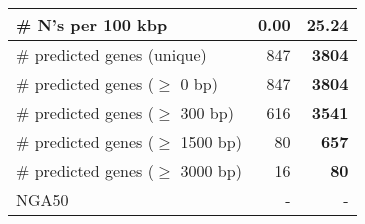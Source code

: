 \documentclass[12pt,a4paper]{article}
\begin{document}
\begin{table}[ht]
\begin{center}
\begin{tabular}{|l*{2}{|r}|}
\# N's per 100 kbp & {\bf 0.00} & 25.24 \\ \hline
\# predicted genes (unique) & 847 & {\bf 3804} \\ \hline
\# predicted genes ($\geq$ 0 bp) & 847 & {\bf 3804} \\ \hline
\# predicted genes ($\geq$ 300 bp) & 616 & {\bf 3541} \\ \hline
\# predicted genes ($\geq$ 1500 bp) & 80 & {\bf 657} \\ \hline
\# predicted genes ($\geq$ 3000 bp) & 16 & {\bf 80} \\ \hline
NGA50 & - & - \\ \hline
\end{tabular}
\end{center}
\end{table}
\end{document}
